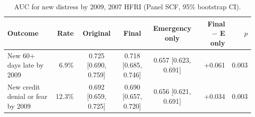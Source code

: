 \begin{table}[htbp]
\centering
\small
\caption{AUC for new distress by 2009, 2007 HFRI (Panel SCF, 95\% bootstrap CI).}
\label{tab:aucfut}
\begin{tabular}{lrcccrr}
\toprule
Outcome & Rate & Original & Final & Emergency only & Final $-$ E only & $p$ \\
\midrule
New 60+ days late by 2009 & 6.9\% & 0.725 [0.690, 0.759] & 0.718 [0.685, 0.746] & 0.657 [0.623, 0.691] & +0.061 & 0.003 \\
New credit denial or fear by 2009 & 12.3\% & 0.692 [0.659, 0.725] & 0.690 [0.657, 0.720] & 0.656 [0.621, 0.691] & +0.034 & 0.003 \\
\bottomrule
\end{tabular}
\end{table}
